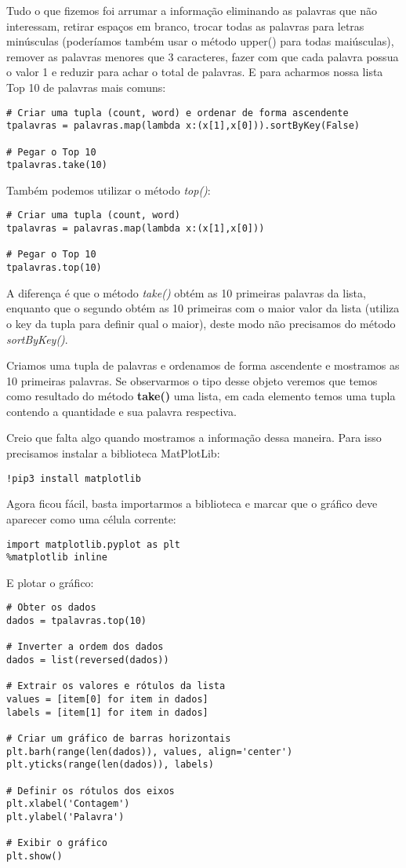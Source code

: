 Tudo o que fizemos foi arrumar a informação eliminando as palavras que não interessam, retirar espaços em branco, trocar todas as palavras para letras minúsculas (poderíamos também usar o método upper() para todas maiúsculas), remover as palavras menores que 3 caracteres, fazer com que cada palavra possua o valor 1 e reduzir para achar o total de palavras. E para acharmos nossa lista Top 10 de palavras mais comuns:
\begin{lstlisting}[]
# Criar uma tupla (count, word) e ordenar de forma ascendente
tpalavras = palavras.map(lambda x:(x[1],x[0])).sortByKey(False)

# Pegar o Top 10
tpalavras.take(10)
\end{lstlisting}

Também podemos utilizar o método \textit{top()}:
\begin{lstlisting}[]
# Criar uma tupla (count, word)
tpalavras = palavras.map(lambda x:(x[1],x[0]))

# Pegar o Top 10
tpalavras.top(10)
\end{lstlisting}

A diferença é que o método \textit{take()} obtém as 10 primeiras palavras da lista, enquanto que o segundo obtém as 10 primeiras com o maior valor da lista (utiliza o key da tupla para definir qual o maior), deste modo não precisamos do método \textit{sortByKey()}.

Criamos uma tupla de palavras e ordenamos de forma ascendente e mostramos as 10 primeiras palavras. Se observarmos o tipo desse objeto veremos que temos como resultado do método \textbf{take()} uma lista, em cada elemento temos uma tupla contendo a quantidade e sua palavra respectiva. 

Creio que falta algo quando mostramos a informação dessa maneira. Para isso precisamos instalar a biblioteca MatPlotLib:
\begin{lstlisting}[]
!pip3 install matplotlib
\end{lstlisting}

Agora ficou fácil, basta importarmos a biblioteca e marcar que o gráfico deve aparecer como uma célula corrente:
\begin{lstlisting}[]
import matplotlib.pyplot as plt
%matplotlib inline
\end{lstlisting}

E plotar o gráfico:
\begin{lstlisting}[]
# Obter os dados
dados = tpalavras.top(10)

# Inverter a ordem dos dados
dados = list(reversed(dados))

# Extrair os valores e rótulos da lista
values = [item[0] for item in dados]
labels = [item[1] for item in dados]

# Criar um gráfico de barras horizontais
plt.barh(range(len(dados)), values, align='center')
plt.yticks(range(len(dados)), labels)

# Definir os rótulos dos eixos
plt.xlabel('Contagem')
plt.ylabel('Palavra')

# Exibir o gráfico
plt.show()
\end{lstlisting}

